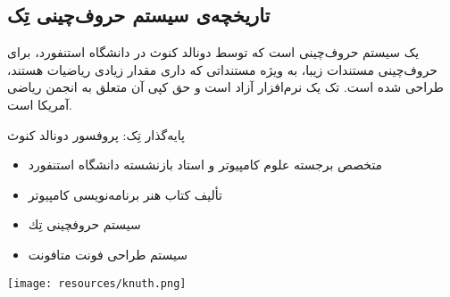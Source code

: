 \label{Sec:Intro}
\subsection[تاریخچه تِک]{تاریخچه‌ی سیستم حروف‌چینی تِک}
\begin{plainslide}

یک سیستم حروف‌چینی است که توسط دونالد کنوث در دانشگاه استنفورد، برای حروف‌چینی مستندات زیبا، به ویژه مستنداتی که داری مقدار زیادی ریاضیات هستند، طراحی شده است. تک یک نرم‌افزار آزاد است و حق کپی آن متعلق به انجمن ریاضی آمریکا است.

\begin{block}{پایه‌گذار تِک: پروفسور دونالد کنوث}
\begin{minipage}[t]{.6\textwidth}{%
{\small
\vspace{-2cm}
\begin{itemize}
\item  متخصص برجسته علوم كامپیوتر و استاد بازنشسته دانشگاه استنفورد
\item  تألیف كتاب هنر برنامه‌نویسی كامپیوتر
\item  سیستم حروفچینی تِك
\item  سیستم طراحی فونت متافونت
\end{itemize}}}\end{minipage}%
\begin{minipage}{.3\textwidth}{%
\vspace{-.4cm}\hspace{6cm}
\begin{center}\texttt{[image: resources/knuth.png]}
\end{center}}\end{minipage}%
\end{block}
\end{plainslide}

